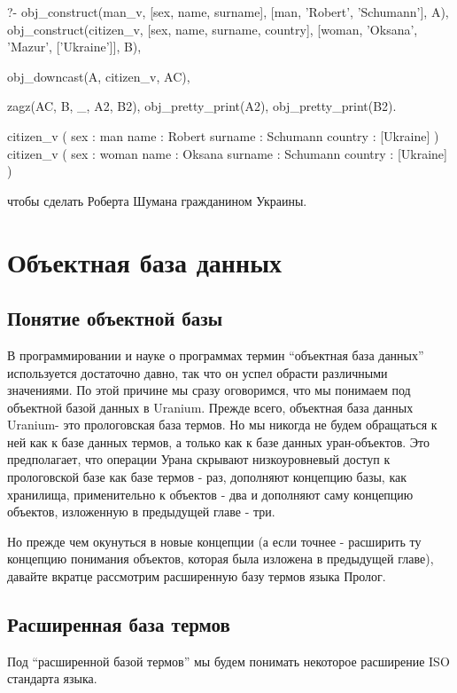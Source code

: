 \documentclass[a4paper]{book}
\def\ur{Uranium}
\begin{document}
\begin{example}{}{}
?- obj_construct(man_v, [sex, name, surname], 
                        [man, 'Robert', 'Schumann'], A), 
   obj_construct(citizen_v, [sex, name, surname, country], 
                 [woman, 'Oksana', 'Mazur', ['Ukraine']], B), 

   obj_downcast(A, citizen_v, AC),

   zagz(AC, B, _, A2, B2), 
   obj_pretty_print(A2), 
   obj_pretty_print(B2).

citizen_v ( 
  sex : man 
  name : Robert 
  surname : Schumann 
  country : [Ukraine] 
) 
citizen_v ( 
  sex : woman 
  name : Oksana 
  surname : Schumann 
  country : [Ukraine] 
) 
\end{example}

чтобы сделать Роберта Шумана гражданином Украины.


\chapter{Объектная база данных}
\label{ur_recorded_db}

\section{Понятие объектной базы}

В программировании и науке о программах термин ``объектная база
данных'' используется достаточно давно, так что он успел обрасти
различными значениями. По этой причине мы сразу оговоримся, что
мы понимаем под объектной базой данных в \ur. Прежде всего,
объектная база данных \ur - это прологовская база термов. Но
мы никогда не будем обращаться к ней как к базе данных термов, а
только как к базе данных уран-объектов. Это предполагает, что
операции Урана скрывают низкоуровневый доступ к прологовской базе
как базе термов - раз, дополняют концепцию базы, как хранилища,
применительно к объектов - два и дополняют саму концепцию
объектов, изложенную в предыдущей главе - три.

Но прежде чем окунуться в новые концепции (а если точнее -
расширить ту концепцию понимания объектов, которая была изложена
в предыдущей главе), давайте вкратце рассмотрим расширенную базу
термов языка Пролог.
 
\section{Расширенная база термов}

Под ``расширенной базой термов'' мы будем понимать некоторое
расширение ISO стандарта языка. 
\end{document}
